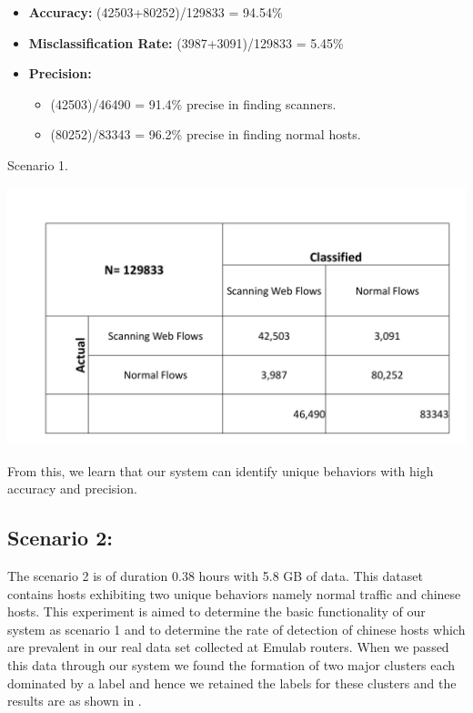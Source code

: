 \begin{itemize}
	\item \textbf{Accuracy:} (42503+80252)/129833 = 94.54\%
	
	\item \textbf{Misclassification Rate:} (3987+3091)/129833 = 5.45\%
	\item \textbf{Precision:} 
	\begin{itemize}
		
				
		\item (42503)/46490 = 91.4\% precise in finding scanners.
		
		\item (80252)/83343 = 96.2\% precise in finding normal hosts.
			
	\end{itemize}

\end{itemize}
\begin{table}[t]
	\caption{Scenario 1.}%
	\centerline{\includegraphics[scale = 0.45]{scenario1.pdf}}	
\end{table}

From this, we learn that our system can identify unique behaviors with high accuracy and precision.

\subsection{Scenario 2:}
The scenario 2 is of duration 0.38 hours with 5.8 GB of data. This dataset contains hosts exhibiting two unique behaviors namely normal traffic and chinese hosts. This experiment is aimed to determine the basic functionality of our system as scenario 1 and to determine the rate of detection of chinese hosts which are prevalent in our real data set collected at Emulab routers. When we passed this data through our system we found the formation of two major clusters each dominated by a label and hence we retained the labels for these clusters and the results are as shown in .

